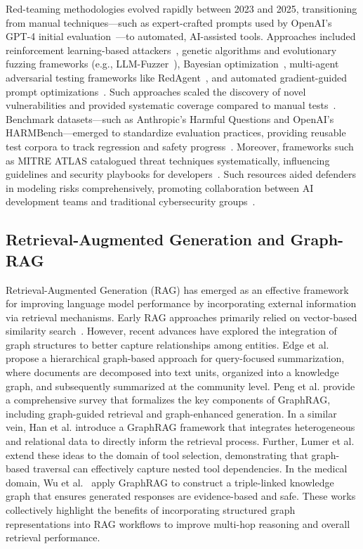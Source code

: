 \documentclass[manuscript,screen,review]{acmart}
\begin{document}
Red-teaming methodologies evolved rapidly between 2023 and 2025, transitioning from manual techniques—such as expert-crafted prompts used by OpenAI's GPT-4 initial evaluation~\cite{kili2024redteaming}—to automated, AI-assisted tools. Approaches included reinforcement learning-based attackers~\cite{lee2023bayesian}, genetic algorithms and evolutionary fuzzing frameworks (e.g., LLM-Fuzzer~\cite{yu2024llmfuzzer}), Bayesian optimization~\cite{lee2023bayesian}, multi-agent adversarial testing frameworks like RedAgent~\cite{xu2024redagent}, and automated gradient-guided prompt optimizations~\cite{zou2023universal}. Such approaches scaled the discovery of novel vulnerabilities and provided systematic coverage compared to manual tests~\cite{yu2024llmfuzzer}. Benchmark datasets—such as Anthropic’s Harmful Questions and OpenAI’s HARMBench—emerged to standardize evaluation practices, providing reusable test corpora to track regression and safety progress~\cite{openreview2024multiturn}. Moreover, frameworks such as MITRE ATLAS catalogued threat techniques systematically, influencing guidelines and security playbooks for developers~\cite{mitre2025atlas}. Such resources aided defenders in modeling risks comprehensively, promoting collaboration between AI development teams and traditional cybersecurity groups~\cite{owasp2024top10llm}.

\subsection{Retrieval-Augmented Generation and Graph-RAG}

Retrieval-Augmented Generation (RAG) has emerged as an effective framework for improving language model performance by incorporating external information via retrieval mechanisms. Early RAG approaches primarily relied on vector-based similarity search~\cite{lewis2020retrieval}. However, recent advances have explored the integration of graph structures to better capture relationships among entities. Edge et al.\cite{edge2024local} propose a hierarchical graph-based approach for query-focused summarization, where documents are decomposed into text units, organized into a knowledge graph, and subsequently summarized at the community level. Peng et al.\cite{peng2024graph} provide a comprehensive survey that formalizes the key components of GraphRAG, including graph-guided retrieval and graph-enhanced generation. In a similar vein, Han et al.\cite{han2024retrieval} introduce a GraphRAG framework that integrates heterogeneous and relational data to directly inform the retrieval process. Further, Lumer et al.\cite{lumer2025graph} extend these ideas to the domain of tool selection, demonstrating that graph-based traversal can effectively capture nested tool dependencies. In the medical domain, Wu et al.~\cite{wu2024medical} apply GraphRAG to construct a triple-linked knowledge graph that ensures generated responses are evidence-based and safe. These works collectively highlight the benefits of incorporating structured graph representations into RAG workflows to improve multi-hop reasoning and overall retrieval performance.
\end{document}
